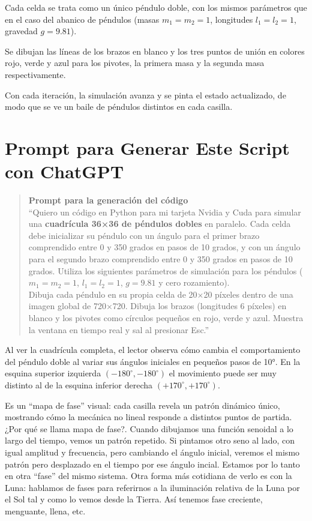 \documentclass[
  11pt,
  a4paper,
  DIV=11,
  numbers=noendperiod]{scrreprt}
\begin{document}
Cada celda se trata como un único péndulo doble, con los mismos
parámetros que en el caso del abanico de péndulos (masas \(m_1=m_2=1\),
longitudes \(l_1=l_2=1\), gravedad \(g=9.81\)).

Se dibujan las líneas de los brazos en blanco y los tres puntos de unión
en colores rojo, verde y azul para los pivotes, la primera masa y la
segunda masa respectivamente.

Con cada iteración, la simulación avanza y se pinta el estado
actualizado, de modo que se ve un baile de péndulos distintos en cada
casilla.

\section{Prompt para Generar Este Script con
ChatGPT}\label{prompt-para-generar-este-script-con-chatgpt}

\begin{quote}
\textbf{Prompt para la generación del código}\\
``Quiero un código en Python para mi tarjeta Nvidia y Cuda para simular
una \textbf{cuadrícula 36×36 de péndulos dobles} en paralelo. Cada celda
debe inicializar su péndulo con un ángulo para el primer brazo
comprendido entre 0 y 350 grados en pasos de 10 grados, y con un ángulo
para el segundo brazo comprendido entre 0 y 350 grados en pasos de 10
grados. Utiliza los siguientes parámetros de simulación para los
péndulos (\(m_1 = m_2 = 1\), \(l_1 = l_2 = 1\), \(g = 9.81\) y cero
rozamiento).\\
Dibuja cada péndulo en su propia celda de 20×20 píxeles dentro de una
imagen global de 720×720. Dibuja los brazos (longitudes 6 píxeles) en
blanco y los pivotes como círculos pequeños en rojo, verde y azul.
Muestra la ventana en tiempo real y sal al presionar Esc.''
\end{quote}

Al ver la cuadrícula completa, el lector observa cómo cambia el
comportamiento del péndulo doble al variar sus ángulos iniciales en
pequeños pasos de 10°. En la esquina superior izquierda
\((-180^\circ,-180^\circ)\) el movimiento puede ser muy distinto al de
la esquina inferior derecha \((+170^\circ,+170^\circ)\).

Es un ``mapa de fase'' visual: cada casilla revela un patrón dinámico
único, mostrando cómo la mecánica no lineal responde a distintos puntos
de partida. ¿Por qué se llama mapa de fase?. Cuando dibujamos una
función senoidal a lo largo del tiempo, vemos un patrón repetido. Si
pintamos otro seno al lado, con igual amplitud y frecuencia, pero
cambiando el ángulo inicial, veremos el mismo patrón pero desplazado en
el tiempo por ese ángulo incial. Estamos por lo tanto en otra ``fase''
del mismo sistema. Otra forma más cotidiana de verlo es con la Luna:
hablamos de fases para referirnos a la iluminación relativa de la Luna
por el Sol tal y como lo vemos desde la Tierra. Así tenemos fase
creciente, menguante, llena, etc.
\end{document}

